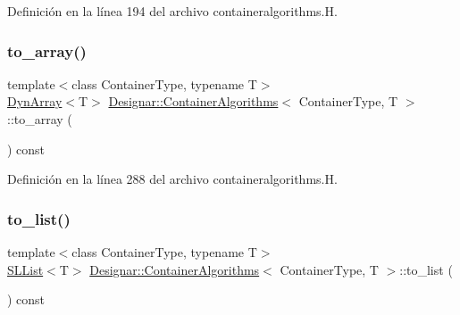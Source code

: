 Definición en la línea 194 del archivo containeralgorithms.\+H.

\mbox{\label{class_designar_1_1_container_algorithms_a2a358d26ad630d1bb5995bff81f66bc4}} 
\subsubsection{\texorpdfstring{to\+\_\+array()}{to\_array()}}
{\footnotesize\ttfamily template$<$class Container\+Type, typename T$>$ \\
\hyperlink{class_designar_1_1_dyn_array}{Dyn\+Array}$<$T$>$ \hyperlink{class_designar_1_1_container_algorithms}{Designar\+::\+Container\+Algorithms}$<$ Container\+Type, T $>$\+::to\+\_\+array (\begin{DoxyParamCaption}{ }\end{DoxyParamCaption}) const\hspace{0.3cm}{\ttfamily [inline]}}



Definición en la línea 288 del archivo containeralgorithms.\+H.

\mbox{\label{class_designar_1_1_container_algorithms_a7800ec47f0b49c369f7341f72c70692a}} 
\subsubsection{\texorpdfstring{to\+\_\+list()}{to\_list()}}
{\footnotesize\ttfamily template$<$class Container\+Type, typename T$>$ \\
\hyperlink{class_designar_1_1_s_l_list}{S\+L\+List}$<$T$>$ \hyperlink{class_designar_1_1_container_algorithms}{Designar\+::\+Container\+Algorithms}$<$ Container\+Type, T $>$\+::to\+\_\+list (\begin{DoxyParamCaption}{ }\end{DoxyParamCaption}) const\hspace{0.3cm}{\ttfamily [inline]}}



